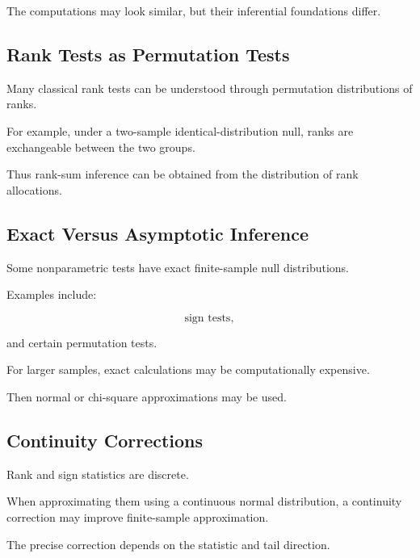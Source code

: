 The computations may look similar, but their inferential foundations
differ.

\subsection{Rank Tests as Permutation Tests}
\label{subsec:rank-tests-permutation}

Many classical rank tests can be understood through permutation
distributions of ranks.

For example, under a two-sample identical-distribution null, ranks are
exchangeable between the two groups.

Thus rank-sum inference can be obtained from the distribution of rank
allocations.

\subsection{Exact Versus Asymptotic Inference}
\label{subsec:exact-versus-asymptotic-nonparametric}

Some nonparametric tests have exact finite-sample null distributions.

Examples include:

\[
\boxed{
\text{sign tests},
}
\]

and certain permutation tests.

For larger samples, exact calculations may be computationally expensive.

Then normal or chi-square approximations may be used.

\subsection{Continuity Corrections}
\label{subsec:continuity-corrections-nonparametric}

Rank and sign statistics are discrete.

When approximating them using a continuous normal distribution, a
continuity correction may improve finite-sample approximation.

The precise correction depends on the statistic and tail direction.

